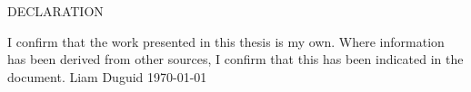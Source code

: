 \documentclass[12pt,a4paper]{report} %
\begin{document}
\newpage
{}
\thispagestyle{empty}
\setcounter{page}{2}
\vspace*{\fill}
\begin{center}
{\LARGE DECLARATION} \newline
\vspace*{1cm}
\end{center}
\vspace{1cm}
I confirm that the work presented in this thesis is my own.  Where information has been derived from other sources, I confirm that this has been indicated in the document.\newline \newline \newline 
\vspace{5cm}
Liam Duguid \newline
\vspace{2cm}
\today
\vspace*{\fill}






\newpage
\pagestyle{headings}

\begin{abstract}
\setcounter{page}{3}
\pagestyle{headings}
\pagestyle{headings}

\end{abstract}
\end{document}
